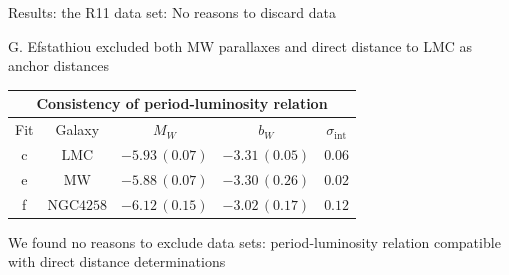 \documentclass{beamer}
\newcommand{\intt}{\mathrm{int}}
\newcommand{\LMC}{\mathrm{LMC}}
\newcommand{\MW}{\mathrm{MW}}
\newcommand{\NGC}{\mathrm{NGC4258}}
\begin{document}
\begin{frame}{Results: the R11 data set: No reasons to discard data}

G. Efstathiou excluded both MW parallaxes and direct distance to LMC as anchor distances

\begin{table}[tbp]
\centering
\begin{tabular}{@{}ccccc}
\hline
\multicolumn{5}{c}{Consistency of period-luminosity relation} \\
\hline
Fit & Galaxy & $M_W$ & $b_W$ & $\sigma_{\intt}$ \\
\hline
 c & $\LMC$ & $-5.93\,(0.07)$& $-3.31\,(0.05)$& $0.06$  \\
 
 e & $\MW$ & $-5.88\,(0.07)$ & $-3.30\,(0.26)$ & $0.02$  \\
  
 f & $\NGC$ & $-6.12\,(0.15)$&$-3.02\,(0.17)$ & $0.12$  \\

\hline
\end{tabular}
\end{table}
We found no reasons to exclude data sets: period-luminosity relation compatible with direct distance determinations
\end{frame}
\end{document}
